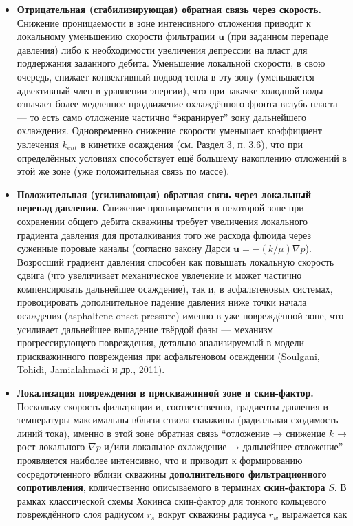 \documentclass[11pt]{extarticle}
\providecommand{\tightlist}{\setlength{\itemsep}{0pt}\setlength{\parskip}{0pt}}
\begin{document}
\begin{itemize}
\tightlist
\item
  \textbf{Отрицательная (стабилизирующая) обратная связь через скорость.} Снижение проницаемости в зоне интенсивного отложения приводит к локальному уменьшению скорости фильтрации \(\mathbf{u}\) (при заданном перепаде давления) либо к необходимости увеличения депрессии на пласт для поддержания заданного дебита. Уменьшение локальной скорости, в свою очередь, снижает конвективный подвод тепла в эту зону (уменьшается адвективный член в уравнении энергии), что при закачке холодной воды означает более медленное продвижение охлаждённого фронта вглубь пласта --- то есть само отложение частично ``экранирует'' зону дальнейшего охлаждения. Одновременно снижение скорости уменьшает коэффициент увлечения \(k_{ent}\) в кинетике осаждения (см. Раздел 3, п. 3.6), что при определённых условиях способствует ещё большему накоплению отложений в этой же зоне (уже положительная связь по массе).
\item
  \textbf{Положительная (усиливающая) обратная связь через локальный перепад давления.} Снижение проницаемости в некоторой зоне при сохранении общего дебита скважины требует увеличения локального градиента давления для проталкивания того же расхода флюида через суженные поровые каналы (согласно закону Дарси \(\mathbf{u}=- (k/\mu)\nabla p\)). Возросший градиент давления способен как повышать локальную скорость сдвига (что увеличивает механическое увлечение и может частично компенсировать дальнейшее осаждение), так и, в асфальтеновых системах, провоцировать дополнительное падение давления ниже точки начала осаждения (asphaltene onset pressure) именно в уже повреждённой зоне, что усиливает дальнейшее выпадение твёрдой фазы --- механизм прогрессирующего повреждения, детально анализируемый в модели прискважинного повреждения при асфальтеновом осаждении (Soulgani, Tohidi, Jamialahmadi и др., 2011).
\item
  \textbf{Локализация повреждения в прискважинной зоне и скин-фактор.} Поскольку скорость фильтрации и, соответственно, градиенты давления и температуры максимальны вблизи ствола скважины (радиальная сходимость линий тока), именно в этой зоне обратная связь ``отложение → снижение \(k\) → рост локального \(\nabla p\) и/или локальное охлаждение → дальнейшее отложение'' проявляется наиболее интенсивно, что и приводит к формированию сосредоточенного вблизи скважины \textbf{дополнительного фильтрационного сопротивления}, количественно описываемого в терминах \textbf{скин-фактора} \(S\). В рамках классической схемы Хокинса скин-фактор для тонкого кольцевого повреждённого слоя радиусом \(r_s\) вокруг скважины радиуса \(r_w\) выражается как
\end{itemize}
\end{document}
